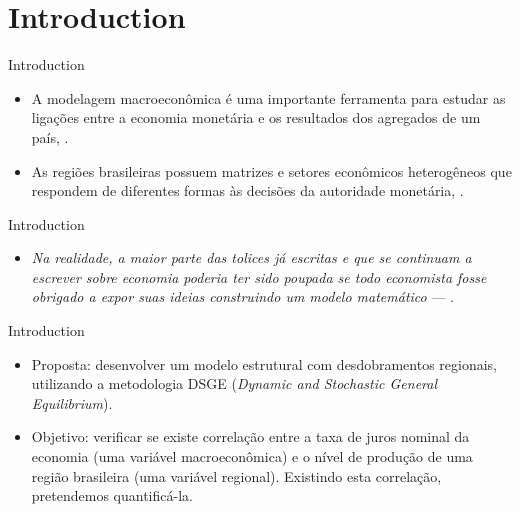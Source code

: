 \documentclass[
presentation.tex
]{subfiles}
\begin{document}
	
\section{Introduction}


\begin{frame}{Introduction}
		
\begin{itemize}
	\item A modelagem macroeconômica é uma importante ferramenta para estudar as ligações entre a economia monetária e os resultados dos agregados de um país, \textcite{gali_monetary_2015}.
	\item As regiões brasileiras possuem matrizes e setores econômicos heterogêneos que respondem de diferentes formas às decisões da autoridade monetária, \textcite{bertanha_efeitos_2008}.
\end{itemize}

\end{frame}


\begin{frame}{Introduction}
	
	\begin{itemize}
		\item \textit{Na realidade, a maior parte das tolices já escritas e que se continuam a escrever sobre economia poderia ter sido poupada se todo economista fosse obrigado a expor suas ideias construindo um modelo matemático} --- \textcite[p.68]{simonsen_microeconomia_1979}.
	\end{itemize}
	
\end{frame}


\begin{frame}{Introduction}
	
	\begin{itemize}
		\item Proposta: desenvolver um modelo estrutural com desdobramentos regionais, utilizando a metodologia DSGE (\textit{Dynamic and Stochastic General Equilibrium}).
		\item Objetivo: verificar se existe correlação entre a taxa de juros nominal da economia (uma variável macroeconômica) e o nível de produção de uma região brasileira (uma variável regional). Existindo esta correlação, pretendemos quantificá-la.
	\end{itemize}
	
\end{frame}
\end{document}
